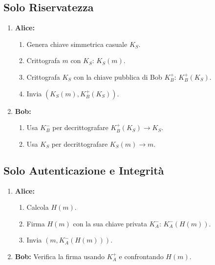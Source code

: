 \documentclass{article}
\begin{document}
\subsection{Solo Riservatezza}
\begin{enumerate}
    \item \textbf{Alice:}
    \begin{enumerate}
        \item Genera chiave simmetrica casuale $K_S$.
        \item Crittografa $m$ con $K_S$: $K_S(m)$.
        \item Crittografa $K_S$ con la chiave pubblica di Bob $K_B^+$: $K_B^+(K_S)$.
        \item Invia $(K_S(m), K_B^+(K_S))$.
    \end{enumerate}
    \item \textbf{Bob:}
    \begin{enumerate}
        \item Usa $K_B^-$ per decrittografare $K_B^+(K_S) \rightarrow K_S$.
        \item Usa $K_S$ per decrittografare $K_S(m) \rightarrow m$.
    \end{enumerate}
\end{enumerate}

\subsection{Solo Autenticazione e Integrità}
\begin{enumerate}
    \item \textbf{Alice:}
    \begin{enumerate}
        \item Calcola $H(m)$.
        \item Firma $H(m)$ con la sua chiave privata $K_A^-$: $K_A^-(H(m))$.
        \item Invia $(m, K_A^-(H(m)))$.
    \end{enumerate}
    \item \textbf{Bob:}
    Verifica la firma usando $K_A^+$ e confrontando $H(m)$.
\end{enumerate}
\end{document}
